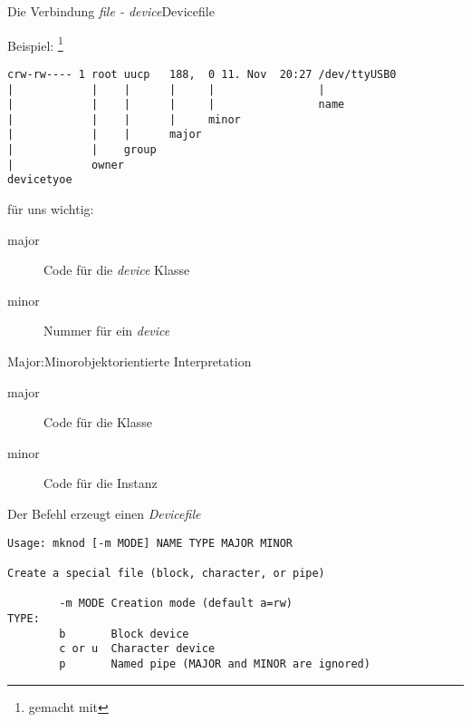 \begin{frame}[fragile]{Die Verbindung {\em file - device}}{Devicefile}
\begin{block}{Beispiel: \footnote{gemacht mit }}
\vspace{-5mm}
{\footnotesize
\begin{verbatim}
crw-rw---- 1 root uucp   188,  0 11. Nov  20:27 /dev/ttyUSB0
|            |    |      |     |                |
|            |    |      |     |                name
|            |    |      |     minor                
|            |    |      major 
|            |    group 
|            owner
devicetyoe
\end{verbatim}
}
\end{block}
\vspace{-6mm}
\begin{block}{für uns wichtig:}
 \vspace{-3mm}
 \begin{description}
  \item[major] Code für die {\em device} Klasse
  \item[minor] Nummer für ein {\em device} 
 \end{description}
\end{block}
\end{frame}

\begin{frame}{Major:Minor}{objektorientierte Interpretation}
 \begin{description}
  \item[major] Code für die {\Large Klasse}
  \item[minor] Code für die {\Large Instanz}
 \end{description}
\end{frame}

\begin{frame}[fragile]{Der Befehl }{erzeugt einen {\em Devicefile}}
\begin{verbatim}
Usage: mknod [-m MODE] NAME TYPE MAJOR MINOR                                    
                                                                                
Create a special file (block, character, or pipe)                               
                                                                                
        -m MODE Creation mode (default a=rw)                                    
TYPE:                                                                           
        b       Block device                                                    
        c or u  Character device                                                
        p       Named pipe (MAJOR and MINOR are ignored)                        
\end{verbatim} 
\end{frame}

